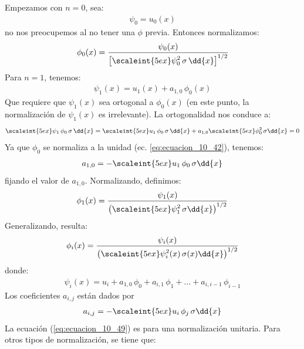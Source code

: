Empezamos con $n = 0$, sea:
\begin{align}
\psi_{0} = u_{0}(x)
\label{eq:ecuacion_10_41}
\end{align}
no nos preocupemos al no tener una $\phi$ previa. Entonces normalizamos:
\begin{align}
\phi_{0}(x) = \dfrac{\psi_{0}(x)}{\left[ \displaystyle \scaleint{5ex} \psi_{0}^{2} \, \sigma  \, \dd{x} \right]^{1/2}}
\label{eq:ecuacion_10_42}
\end{align}
Para $n = 1$, tenemos:
\begin{align}
\psi_{1}(x) = u_{1}(x) + a_{1,0} \, \phi_{0}(x)
\label{eq:ecuacion_10_43}
\end{align}
Que requiere que $\psi_{1}(x)$ sea ortogonal a $\phi_{0}(x)$ (en este punto, la normalización de $\psi_{1}(x)$ es irrelevante). La ortogonalidad nos conduce a:
\begin{align}
\scaleint{5ex} \psi_{1} \, \phi_{0} \, \sigma \, \dd{x} = \scaleint{5ex} u_{1} \, \phi_{0} \, \sigma \, \dd{x} + a_{1,0} \scaleint{5ex} \phi_{0}^{2} \, \sigma \dd{x} = 0
\label{eq:ecuacion_10_44}
\end{align}
Ya que $\phi_{0}$ se normaliza a la unidad (ec. \ref{eq:ecuacion_10_42}), tenemos:
\begin{align}
a_{1,0} = - \scaleint{5ex} u_{1} \, \phi_{0} \, \sigma \dd{x}
\label{eq:ecuacion_10_45}
\end{align}
fijando el valor de $a_{1, 0}$. Normalizando, definimos:
\begin{align}
\phi_{1} (x) = \dfrac{\psi_{1}(x)}{\left( \displaystyle \scaleint{5ex} \psi_{1}^{2} \, \sigma \dd{x} \right)^{1/2}}
\label{eq:ecuacion_10_46}
\end{align}
Generalizando, resulta:
\begin{align}
\phi_{i}(x) = \dfrac{\psi_{i}(x)}{\left( \displaystyle \scaleint{5ex} \psi_{i}^{2}(x) \, \sigma (x) \dd{x} \right)^{1/2}}
\label{eq:ecuacion_10_47}
\end{align}
donde:
\begin{align}
\psi_{i}(x) = u_{i} + a_{1, 0} \, \phi_{0} + a_{i, 1} \, \phi_{1} + \ldots + a_{i, i-1} \, \phi_{i-1}
\label{eq:ecuacion_10_48}
\end{align}
Los coeficientes $a_{i, j}$ están dados por
\begin{align}
a_{i, j} = - \scaleint{5ex} u_{i} \, \phi_{j} \, \sigma  \dd{x}
\label{eq:ecuacion_10_49}
\end{align}
La ecuación (\ref{eq:ecuacion_10_49}) es para una normalización unitaria. Para otros tipos de normalización, se tiene que:
